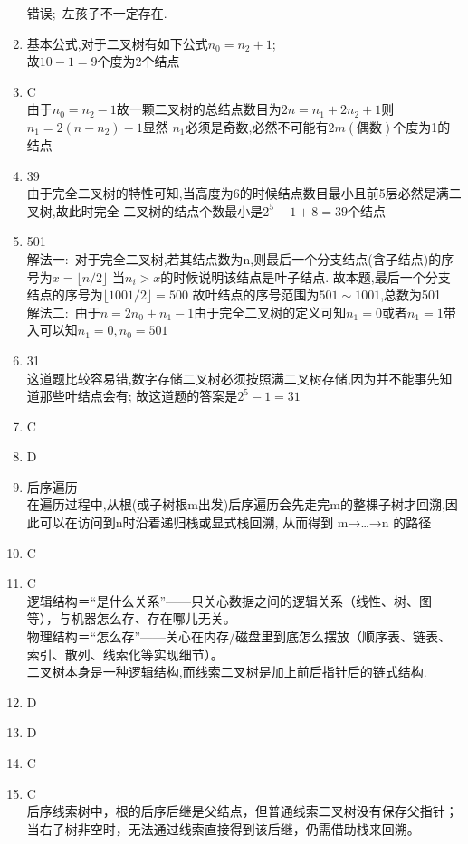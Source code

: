 \documentclass[12pt, a4paper, oneside, UTF8]{ctexbook}
\begin{document}
\begin{enumerate}[label=\arabic*.\textbf{答案}:]
    错误;\ 左孩子不一定存在. 
    \item 
    基本公式,对于二叉树有如下公式$n_0=n_2+1$;\\
    故$10-1=9$个度为2个结点 
    \item C \\
    由于$n_0=n_2-1$故一颗二叉树的总结点数目为$2n=n_1+2n_2+1$则$n_1=2(n-n_2)-1$显然
    $n_1$必须是奇数,必然不可能有$2m(\text{偶数})$个度为1的结点 
    \item 39 \\
    由于完全二叉树的特性可知,当高度为6的时候结点数目最小且前5层必然是满二叉树,故此时完全
    二叉树的结点个数最小是$2^5-1+8=39$个结点 
    \item 501 \\
    解法一:\ 对于完全二叉树,若其结点数为n,则最后一个分支结点(含子结点)的序号为$x=\lfloor n/2 \rfloor$
    当$n_i>x$的时候说明该结点是叶子结点. 故本题,最后一个分支结点的序号为$\lfloor 1001/2 \rfloor=500$
    故叶结点的序号范围为$501\sim 1001$,总数为501 \\
    解法二:\ 由于$n=2n_0+n_1-1$由于完全二叉树的定义可知$n_1=0$或者$n_1=1$带入可以知$n_1=0,n_0=501$
    \item 31 \\
    这道题比较容易错,数字存储二叉树必须按照满二叉树存储,因为并不能事先知道那些叶结点会有; 
    故这道题的答案是$2^5-1=31$
    \item C 
    \item D
    \item 后序遍历 \\
    在遍历过程中,从根(或子树根m出发)后序遍历会先走完m的整棵子树才回溯,因此可以在访问到n时沿着递归栈或显式栈回溯,
    从而得到 m→…→n 的路径
    \item C 
    \item C \\
    逻辑结构＝“是什么关系”——只关心数据之间的逻辑关系（线性、树、图等），与机器怎么存、存在哪儿无关。 \\
    物理结构＝“怎么存”——关心在内存/磁盘里到底怎么摆放（顺序表、链表、索引、散列、线索化等实现细节）。 \\
    二叉树本身是一种逻辑结构,而线索二叉树是加上前后指针后的链式结构. 
    \item D 
    \item D
    \item C
    \item C \\
    后序线索树中，根的后序后继是父结点，但普通线索二叉树没有保存父指针；
    当右子树非空时，无法通过线索直接得到该后继，仍需借助栈来回溯。

\end{enumerate}
\end{document}
